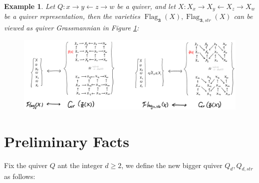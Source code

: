 \documentclass[reqno,11pt]{amsart}
\numberwithin{equation}{section}
\theoremstyle{plain}
\newtheorem{eg}[theorem]{Example}
\theoremstyle{plain}
\numberwithin{equation}{section}
\theoremstyle{remark}
\newcommand{\Flag}[1]{\operatorname{Flag}_{\mathbf{#1}}}
\newcommand{\Flagstr}[1]{\operatorname{Flag}_{\mathbf{#1},str}}
\begin{document}
\begin{eg}
Let $Q\colon x \longrightarrow y \longleftarrow z \longrightarrow w$ be a quiver, and let $X\colon X_x \longrightarrow X_y \longleftarrow X_z \longrightarrow X_w$ be a quiver representation, then the varieties $\Flag{3}(X),\Flagstr{3}(X)$ can be viewed as quiver Grassmannian in Figure \ref{fig:flagasgr}:
\begin{center}
	\begin{figure}[ht]
		\vspace{0cm}
		\centering
		\includegraphics[width=15cm]{figures/flagasgr.png}
		\caption{}
		\label{fig:flagasgr}
	\end{figure}
\end{center}


\end{eg}

\section{Preliminary Facts}\label{sec:flag=gr}
Fix the quiver $Q$ ant the integer $d \geqslant 2$, we define the new bigger quiver $Q_{d},Q_{d,str}$ as follows:
\end{document}

